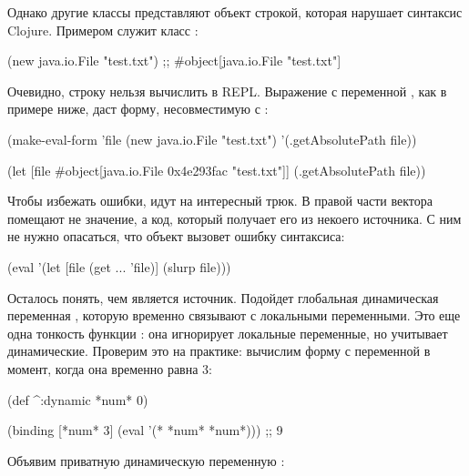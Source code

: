 Однако другие классы представляют объект строкой, которая нарушает синтаксис Clojure. Примером служит класс :

\begin{english}
  \begin{clojure}
(new java.io.File "test.txt")
;; #object[java.io.File "test.txt"]
  \end{clojure}
\end{english}

Очевидно, строку  нельзя вычислить в REPL. Выражение с переменной , как в примере ниже, даст форму, несовместимую с :

\begin{english}
  \begin{clojure}
(make-eval-form
 {'file (new java.io.File "test.txt")}
 '(.getAbsolutePath file))

(let [file #object[java.io.File 0x4e293fac "test.txt"]]
  (.getAbsolutePath file))
  \end{clojure}
\end{english}

Чтобы избежать ошибки, идут на интересный трюк. В правой части вектора  помещают не значение, а код, который получает его из некоего источника. С ним не нужно опасаться, что объект  вызовет ошибку синтаксиса:

\begin{english}
  \begin{clojure}
(eval '(let [file (get ... 'file)]
         (slurp file)))
  \end{clojure}
\end{english}

Осталось понять, чем является источник. Подойдет глобальная динамическая переменная , которую временно связывают с локальными переменными. Это еще одна тонкость функции : она игнорирует локальные переменные, но учитывает динамические. Проверим это на практике: вычислим форму с переменной  в момент, когда она временно равна 3:

\begin{english}
  \begin{clojure}
(def ^:dynamic *num* 0)

(binding [*num* 3]
  (eval '(* *num* *num*)))
;; 9
  \end{clojure}
\end{english}

Объявим приватную динамическую переменную :

